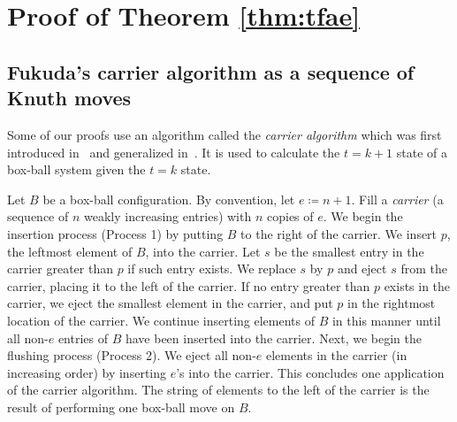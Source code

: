 \documentclass[submission]{FPSAC2021}
\theoremstyle{plain}
\theoremstyle{definition}
\numberwithin{equation}{section}
\begin{document}
\section{Proof of Theorem \ref{thm:tfae}}
\label{sec:proof of tfae}
\subsection{Fukuda's carrier algorithm as a sequence of Knuth moves}\label{sec: carrier alg bg}
Some of our proofs use an algorithm called 
the \emph{carrier algorithm}  
which was first introduced in~\cite{TM97carrier} 
and generalized in~\cite[Section~3.3]{fukuda04}.
It is used to calculate the $t=k+1$ state of a box-ball system given the $t = k$ state.


Let $B$ be a box-ball configuration. By convention, let $e\coloneqq n+1$. 
Fill a \emph{carrier} (a sequence of $n$ weakly increasing entries) with $n$ copies of $e$. 
We begin the insertion process (Process 1) by putting $B$ to the right of the carrier. We insert $p$, the leftmost element of $B$, into the carrier.
Let $s$ be the smallest entry in the carrier greater than $p$ if such entry exists. We replace $s$ by $p$ and eject $s$ from the carrier, placing it to the left of the carrier. If no entry greater than $p$ exists in the carrier, we eject the smallest element in the carrier, and put $p$ in the rightmost location of the carrier.
We continue inserting elements of $B$ in this manner until all non-$e$ entries of $B$ have been inserted into the carrier. 
Next, we begin the flushing process (Process 2). We eject all non-$e$ elements in the carrier (in increasing order) by inserting $e$'s into the carrier. This concludes one application of the carrier algorithm. The string of elements to the left of the carrier is the result of performing one box-ball move on $B$.
\end{document}
